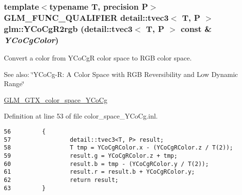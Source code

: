 \hypertarget{group__gtx__color__space___y_co_cg_gecf0b1d1103554b9ec4e274f8284f7ad}{
\subsubsection[YCoCgR2rgb]{\setlength{\rightskip}{0pt plus 5cm}template$<$typename T, precision P$>$ GLM\_\-FUNC\_\-QUALIFIER detail::tvec3$<$ T, P $>$ glm::YCoCgR2rgb (detail::tvec3$<$ T, P $>$ const \& {\em YCoCgColor})}}
\label{group__gtx__color__space___y_co_cg_gecf0b1d1103554b9ec4e274f8284f7ad}


Convert a color from YCoCgR color space to RGB color space. \begin{Desc}
\item[See also:]\char`\"{}YCoCg-R: A Color Space with RGB Reversibility and Low Dynamic Range\char`\"{} 

\hyperlink{group__gtx__color__space___y_co_cg}{GLM\_\-GTX\_\-color\_\-space\_\-YCoCg} \end{Desc}


Definition at line 53 of file color\_\-space\_\-YCoCg.inl.

\begin{Code}\begin{verbatim}56         {
57                 detail::tvec3<T, P> result;
58                 T tmp = YCoCgRColor.x - (YCoCgRColor.z / T(2));
59                 result.g = YCoCgRColor.z + tmp;
60                 result.b = tmp - (YCoCgRColor.y / T(2));
61                 result.r = result.b + YCoCgRColor.y;
62                 return result;
63         }
\end{verbatim}
\end{Code}


